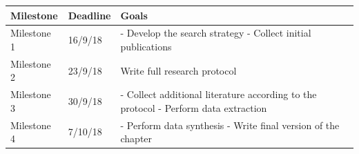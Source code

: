\documentclass[]{book}
\begin{document}
\begin{longtable}[]{@{}lll@{}}
\toprule
\begin{minipage}[b]{0.22\columnwidth}\raggedright\strut
Milestone\strut
\end{minipage} & \begin{minipage}[b]{0.18\columnwidth}\raggedright\strut
Deadline\strut
\end{minipage} & \begin{minipage}[b]{0.48\columnwidth}\raggedright\strut
Goals\strut
\end{minipage}\tabularnewline
\midrule
\endhead
\begin{minipage}[t]{0.22\columnwidth}\raggedright\strut
Milestone 1\strut
\end{minipage} & \begin{minipage}[t]{0.18\columnwidth}\raggedright\strut
16/9/18\strut
\end{minipage} & \begin{minipage}[t]{0.48\columnwidth}\raggedright\strut
- Develop the search strategy - Collect initial publications\strut
\end{minipage}\tabularnewline
\begin{minipage}[t]{0.22\columnwidth}\raggedright\strut
Milestone 2\strut
\end{minipage} & \begin{minipage}[t]{0.18\columnwidth}\raggedright\strut
23/9/18\strut
\end{minipage} & \begin{minipage}[t]{0.48\columnwidth}\raggedright\strut
Write full research protocol\strut
\end{minipage}\tabularnewline
\begin{minipage}[t]{0.22\columnwidth}\raggedright\strut
Milestone 3\strut
\end{minipage} & \begin{minipage}[t]{0.18\columnwidth}\raggedright\strut
30/9/18\strut
\end{minipage} & \begin{minipage}[t]{0.48\columnwidth}\raggedright\strut
- Collect additional literature according to the protocol - Perform data
extraction\strut
\end{minipage}\tabularnewline
\begin{minipage}[t]{0.22\columnwidth}\raggedright\strut
Milestone 4\strut
\end{minipage} & \begin{minipage}[t]{0.18\columnwidth}\raggedright\strut
7/10/18\strut
\end{minipage} & \begin{minipage}[t]{0.48\columnwidth}\raggedright\strut
- Perform data synthesis - Write final version of the chapter\strut
\end{minipage}\tabularnewline
\bottomrule
\end{longtable}
\end{document}

